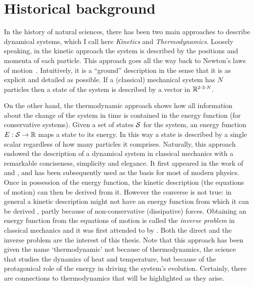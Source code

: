 % 
\section{Historical background}
In the history of natural sciences,
there has been two main approaches to describe dynamical systems,
which I call here
\emph{Kinetics} and \emph{Thermodynamics}.
Loosely speaking, in the kinetic approach the system is
described by the positions and momenta of each particle.
This approach goes all the way back to
Newton's laws of motion~\citep{newton}.
Intuitively, it is a ``ground'' description in the sense that
it is as explicit and detailed as possible.
If a (classical) mechanical system has $N$ particles
then a state of the system is described by
a vector in $\mathbb{R}^{2 \cdot 3 \cdot N}$.

On the other hand,
the thermodynamic approach shows how
all information about the change of the system in time
is contained in the energy function (for conservative systems).
Given a set of states $\mathcal{S}$ for the system,
an energy function $E: \mathcal{S} \to \mathbb{R}$ maps a state to its energy.
In this way a state is described by a single scalar
regardless of how many particles it comprises.
Naturally, this approach endowed the description of
a dynamical system in classical mechanics
with a remarkable conciseness, simplicity and elegance.
It first appeared in the work of
\citet{lagrange2} and \citet{hamilton},
and has been subsequently used as the basis for most of modern physics.
Once in possession of the energy function,
the kinetic description (\ie the equations of motion)
can then be derived from it.
However the converse is not true:
in general a kinetic description might not have an energy function
from which it can be derived \citep{santilli},
partly because of non-conservative (\eg dissipative) forces.
Obtaining an energy function from the equations of motion
is called the \emph{inverse problem} in classical mechanics
and it was first attended to by \citet{helmholtz}.
Both the direct and the inverse problem are the interest of this thesis.
Note that this approach has been given the name `thermodynamic'
not because of thermodynamics,
the science that studies the dynamics of heat and temperature,
but because of the protagonical role of the energy
in driving the system's evolution.
Certainly, there are connections to thermodynamics
that will be highlighted as they arise.

